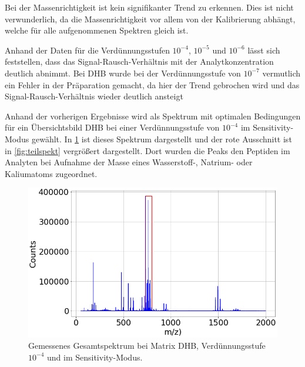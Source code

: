 Bei der Massenrichtigkeit ist kein signifikanter Trend zu erkennen.
Dies ist nicht verwunderlich, da die Massenrichtigkeit vor allem von der Kalibrierung abhängt, welche für alle aufgenommenen Spektren gleich ist.

Anhand der Daten für die Verdünnungsstufen $10^{-4}$, $10^{-5}$ und $10^{-6}$ lässt sich feststellen, dass das Signal-Rausch-Verhältnis mit der Analytkonzentration deutlich abnimmt.
Bei DHB wurde bei der Verdünnungsstufe von $10^{-7}$ vermutlich ein Fehler in der Präparation gemacht, da hier der Trend gebrochen wird und das Signal-Rausch-Verhältnis wieder deutlich ansteigt
\par

Anhand der vorherigen Ergebnisse wird als Spektrum mit optimalen Bedingungen für ein Übersichtsbild DHB bei einer Verdünnungsstufe von $10^{-4}$ im Sensitivity-Modus gewählt.
In \cref{fig_gesamtspekt} ist dieses Spektrum dargestellt und der rote Ausschnitt ist in \cref{fig:teilspekt} vergrößert dargestellt.
Dort wurden die Peaks den Peptiden im Analyten bei Aufnahme der Masse eines Wasserstoff-, Natrium- oder Kaliumatoms zugeordnet.

\begin{figure}[!ht]
    \centering
    \includegraphics[width=1\textwidth]{img/overview-D02_Oben_S}
    \caption{Gemessenes Gesamtspektrum bei Matrix DHB, Verdünnungsstufe $10^{-4}$ und im Sensitivity-Modus.}
    \label{fig_gesamtspekt}
\end{figure}

